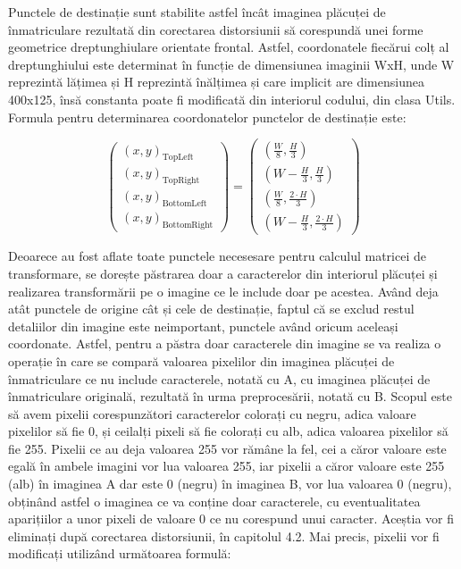 \documentclass[12pt]{article}
\begin{document}
Punctele de destinație sunt stabilite astfel \^{i}nc\^{a}t imaginea pl\u{a}cuței de \^{i}nmatriculare rezultat\u{a} din corectarea distorsiunii s\u{a} corespund\u{a} unei forme geometrice dreptunghiulare orientate frontal. Astfel, coordonatele fiec\u{a}rui colț al dreptunghiului este determinat \^{i}n funcție de dimensiunea imaginii WxH, unde W reprezint\u{a} l\u{a}țimea și H reprezint\u{a} \^{i}n\u{a}lțimea și care implicit are dimensiunea 400x125, \^{i}ns\u{a} constanta poate fi modificat\u{a} din interiorul codului, din clasa Utils. Formula pentru determinarea coordonatelor punctelor de destinație este: 

\begin{equation}
\begin{pmatrix} (x,y)_\mathrm{TopLeft} \\ (x,y)_\mathrm{TopRight} \\ (x,y)_\mathrm{BottomLeft} \\ (x,y)_\mathrm{BottomRight} \end{pmatrix}  = \begin{pmatrix} (\frac{W}{8}, \frac{H}{3}) \\ (W-\frac{H}{3}, \frac{H}{3}) \\ (\frac{W}{8}, \frac{2 \cdot H}{3}) \\ (W-\frac{H}{3}, \frac{2 \cdot H}{3}) \end{pmatrix} 
\end{equation}

Deoarece au fost aflate toate punctele necesesare pentru calculul matricei de transformare, se dorește p\u{a}strarea doar a caracterelor din interiorul pl\u{a}cuței și realizarea transform\u{a}rii pe o imagine ce le include doar pe acestea. Av\^{a}nd deja at\^{a}t punctele de origine c\^{a}t și cele de destinație, faptul c\u{a} se exclud restul detaliilor din imagine este neimportant, punctele av\^{a}nd oricum aceleași coordonate. Astfel, pentru a p\u{a}stra doar caracterele din imagine se va realiza o operație \^{i}n care se compar\u{a} valoarea pixelilor din imaginea pl\u{a}cuței de \^{i}nmatriculare ce nu include caracterele, notat\u{a} cu A, cu imaginea pl\u{a}cuței de \^{i}nmatriculare original\u{a}, rezultat\u{a} \^{i}n urma preproces\u{a}rii, notat\u{a} cu B. Scopul este s\u{a} avem pixelii corespunz\u{a}tori caracterelor colorați cu negru, adica valoare pixelilor s\u{a} fie 0, și ceilalți pixeli s\u{a} fie colorați cu alb, adica valoarea pixelilor s\u{a} fie 255. Pixelii ce au deja valoarea 255 vor r\u{a}m\^{a}ne la fel, cei a c\u{a}ror valoare este egal\u{a} \^{i}n ambele imagini vor lua valoarea 255, iar pixelii a c\u{a}ror valoare este 255 (alb) \^{i}n imaginea A dar este 0 (negru) \^{i}n imaginea B, vor lua valoarea 0 (negru), obțin\^{a}nd astfel o imaginea ce va conține doar caracterele, cu eventualitatea aparițiilor a unor pixeli de valoare 0 ce nu corespund unui caracter. Aceștia vor fi eliminați dup\u{a} corectarea distorsiunii, \^{i}n capitolul 4.2. Mai precis, pixelii vor fi modificați utiliz\^{a}nd urm\u{a}toarea formul\u{a}:
\end{document}
